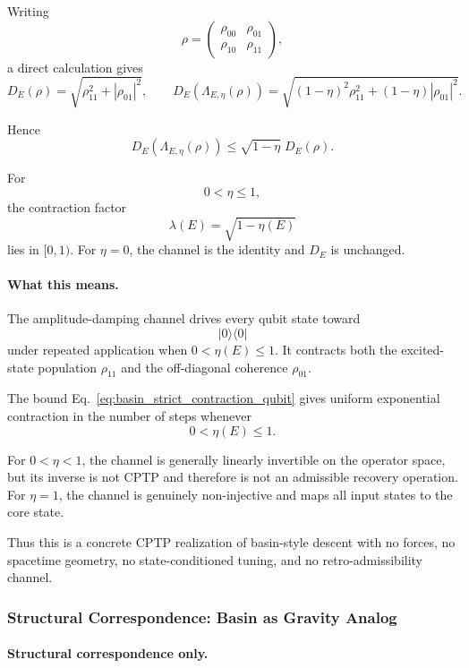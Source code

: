 \documentclass[aps,prx,onecolumn,11pt]{revtex4-2}
\theoremstyle{plain}
\theoremstyle{definition}
\theoremstyle{remark}
\begin{document}
Writing
\[
\rho
=
\begin{pmatrix}
\rho_{00} & \rho_{01}\\
\rho_{10} & \rho_{11}
\end{pmatrix},
\]
a direct calculation gives
\begin{equation}
D_E(\rho)
=
\sqrt{\rho_{11}^2+|\rho_{01}|^2},
\qquad
D_E(\Lambda_{E,\eta}(\rho))
=
\sqrt{
(1-\eta)^2\rho_{11}^2
+
(1-\eta)|\rho_{01}|^2
}.
\label{eq:basin_depth_qubit_closed_form}
\end{equation}

Hence
\begin{equation}
D_E(\Lambda_{E,\eta}(\rho))
\leq
\sqrt{1-\eta}\;D_E(\rho).
\label{eq:basin_strict_contraction_qubit}
\end{equation}

For
\[
0<\eta\leq 1,
\]
the contraction factor
\[
\lambda(E)=\sqrt{1-\eta(E)}
\]
lies in \([0,1)\). For \(\eta=0\), the channel is the identity and
\(D_E\) is unchanged.

\paragraph{What this means.}

The amplitude-damping channel drives every qubit state toward
\[
|0\rangle\langle0|
\]
under repeated application when \(0<\eta(E)\leq 1\). It contracts both
the excited-state population \(\rho_{11}\) and the off-diagonal
coherence \(\rho_{01}\).

The bound Eq.~\eqref{eq:basin_strict_contraction_qubit} gives uniform
exponential contraction in the number of steps whenever
\[
0<\eta(E)\leq 1.
\]

For \(0<\eta<1\), the channel is generally linearly invertible on the
operator space, but its inverse is not CPTP and therefore is not an
admissible recovery operation. For \(\eta=1\), the channel is genuinely
non-injective and maps all input states to the core state.

Thus this is a concrete CPTP realization of basin-style descent with no
forces, no spacetime geometry, no state-conditioned tuning, and no
retro-admissibility channel.

\subsubsection{Structural Correspondence: Basin as Gravity Analog}
\label{toy:basin_gravity_analogy_justification}

\paragraph{Structural correspondence only.}
\end{document}
